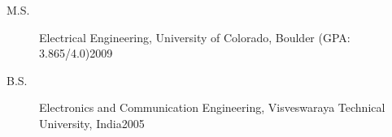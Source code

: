 
\begin{description}
\item[M.S.] Electrical Engineering, University of Colorado, Boulder (GPA: 3.865/4.0)\hfill2009
\item[B.S.] Electronics and Communication Engineering, Visveswaraya Technical University, India\hfill2005
\end{description}


